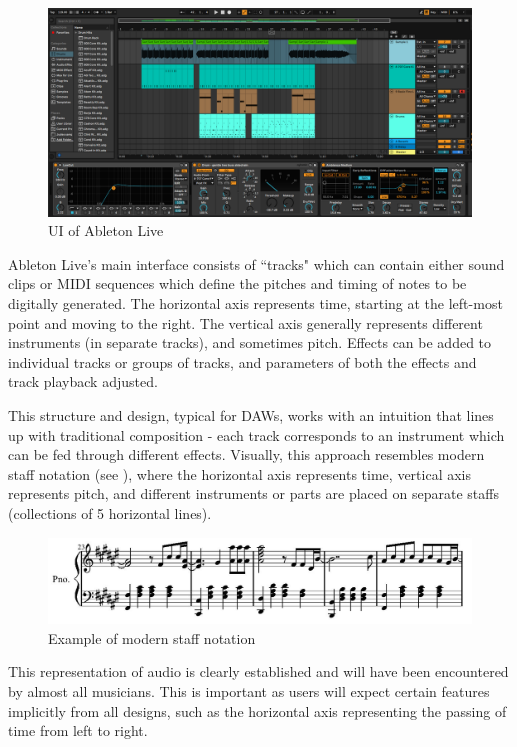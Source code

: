 \documentclass[12pt,a4paper,oneside,openright]{report}
\begin{document}
\begin{figure}[h]
    \centering
    \includegraphics[scale=0.3]{images/ableton example.png}
    \caption{UI of Ableton Live}
    \label{fig:ableton}
\end{figure}

Ableton Live's main interface consists of ``tracks" which can contain either sound clips or MIDI sequences which define the pitches and timing of notes to be digitally generated. The horizontal axis represents time, starting at the left-most point and moving to the right. The vertical axis generally represents different instruments (in separate tracks), and sometimes pitch. Effects can be added to individual tracks or groups of tracks, and parameters of both the effects and track playback adjusted. 

This structure and design, typical for DAWs, works with an intuition that lines up with traditional composition - each track corresponds to an instrument which can be fed through different effects. Visually, this approach resembles modern staff notation (see ), where the horizontal axis represents time, vertical axis represents pitch, and different instruments or parts are placed on separate staffs (collections of 5 horizontal lines).

\begin{figure}[h]
    \centering
    \includegraphics[scale=0.7]{images/modern staff notation.png}
    \caption{Example of modern staff notation}
    \label{fig:staff_not}
\end{figure}

This representation of audio is clearly established and will have been encountered by almost all musicians. This is important as users will expect certain features implicitly from all designs, such as the horizontal axis representing the passing of time from left to right.
\end{document}
